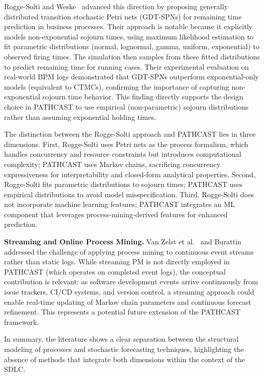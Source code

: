 Rogge-Solti and Weske~\cite{RoggeSolti2015NonMarkovianSPN} advanced this
direction by proposing generally distributed transition stochastic Petri
nets (GDT-SPNs) for remaining time prediction in business processes.
Their approach is notable because it explicitly models non-exponential
sojourn times, using maximum likelihood estimation to fit parametric
distributions (normal, lognormal, gamma, uniform, exponential) to
observed firing times. The simulation then samples from these fitted
distributions to predict remaining time for running cases. Their
experimental evaluation on real-world BPM logs demonstrated that
GDT-SPNs outperform exponential-only models (equivalent to CTMCs),
confirming the importance of capturing non-exponential sojourn time
behavior. This finding directly supports the design choice in
PATHCAST to use empirical (non-parametric) sojourn distributions
rather than assuming exponential holding times.

The distinction between the Rogge-Solti approach and PATHCAST lies
in three dimensions. First, Rogge-Solti uses Petri nets as the process
formalism, which handles concurrency and resource constraints but
introduces computational complexity; PATHCAST uses Markov chains,
sacrificing concurrency expressiveness for interpretability and
closed-form analytical properties. Second, Rogge-Solti fits parametric
distributions to sojourn times; PATHCAST uses empirical
distributions to avoid model misspecification. Third, Rogge-Solti does
not incorporate machine learning features; PATHCAST integrates an
ML component that leverages process-mining-derived features for enhanced
prediction.

\textbf{Streaming and Online Process Mining.} Van Zelst et
al.~\cite{vanzelst2018} and Burattin~\cite{burattin2022}
addressed the challenge of applying process mining to continuous event
streams rather than static logs. While streaming PM is not directly
employed in PATHCAST (which operates on completed event logs),
the conceptual contribution is relevant: as software development events
arrive continuously from issue trackers, CI/CD systems, and version
control, a streaming approach could enable real-time updating of Markov
chain parameters and continuous forecast refinement. This represents a
potential future extension of the PATHCAST framework.

In summary, the literature shows a clear separation between the structural modeling of processes and stochastic forecasting techniques, highlighting the absence of methods that integrate both dimensions within the context of the SDLC.


